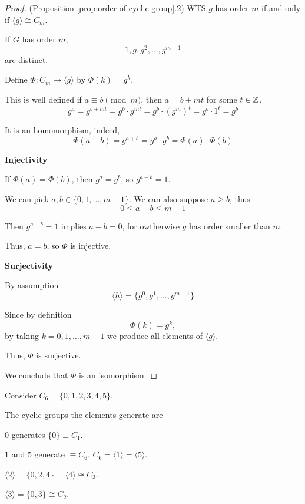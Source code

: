 \begin{proof}(Proposition \ref{prop:order-of-cyclic-group}.2)
    WTS $g$ has order $m$ if and only if $\langle g \rangle \cong C_m$.

    If $G$ has order $m$, \[
        1, g, g^2, \dots, g^{m - 1}
    \] are distinct.

    Define $\Phi: C_m \to \langle g \rangle$ by $\Phi(k) = g^k$.

    This is well defined if $a \equiv b \pmod{m}$, then $a = b + mt$ for some $t \in \mathbb{Z}$. \[
        g^a = g^{b + mt} = g^b \cdot g^{mt} = g^b \cdot (g^m)^t = g^b \cdot 1^t = g^b
    \] 

    It is an homomorphism, indeed, \[
        \Phi(a + b) = g^{a + b} = g^a \cdot g^b = \Phi(a) \cdot \Phi(b)
    \]

    \begin{listu}
        \item \textbf{Injectivity}
        
        If $\Phi(a) = \Phi(b)$, then $g^a = g^b$, so $g^{a - b} = 1$.

        We can pick $a, b \in \{ 0, 1, \dots, m - 1 \}$. We can also suppose $a \ge b$, thus \[
            0 \le a - b \le m - 1
        \]

        Then $g^{a - b} = 1$ implies $a - b = 0$, for owtherwise $g$ has order smaller than $m$. 

        Thus, $a = b$, so $\Phi$ is injective.

        \item \textbf{Surjectivity}

        By assumption \[
            \langle h \rangle = \{ g^0, g^1, \dots, g^{m - 1} \}
        \]

        Since by definition \[
            \Phi(k) = g^k,
        \] by taking $k = 0, 1, \dots, m - 1$ we produce all elements of $\langle g \rangle$.

        Thus, $\Phi$ is surjective.
    \end{listu}

    We conclude that $\Phi$ is an isomorphism.
\end{proof}

\begin{example}
    Consider $C_6 = \{ 0, 1, 2, 3, 4, 5 \}$.

    The cyclic groups the elements generate are
    \begin{listu}
        \item $0$ generates $\{ 0 \} \equiv C_1$.
        \item $1$ and $5$ generate $\equiv C_6$, $C_6 = \langle 1 \rangle = \langle 5 \rangle$.
        \item $\langle 2 \rangle = \{ 0, 2, 4\} = \langle 4 \rangle \cong C_3$. 
        \item $\langle 3 \rangle = \{ 0, 3 \} \cong C_2$.
    \end{listu}
\end{example}

